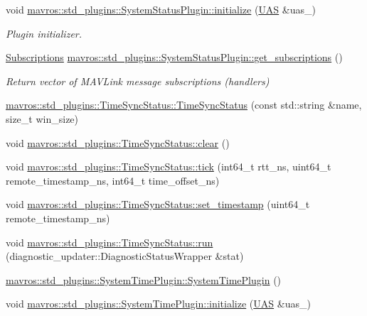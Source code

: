 \begin{DoxyCompactItemize}
\item 
void \mbox{\hyperlink{group__plugin_ga6db82bbd7c82ba5963472e1946431313}{mavros\+::std\+\_\+plugins\+::\+System\+Status\+Plugin\+::initialize}} (\mbox{\hyperlink{classmavros_1_1UAS}{U\+AS}} \&uas\+\_\+)
\begin{DoxyCompactList}\small\item\em Plugin initializer. \end{DoxyCompactList}\item 
\mbox{\hyperlink{group__plugin_ga8967d61fc77040e0c3ea5a4585d62a09}{Subscriptions}} \mbox{\hyperlink{group__plugin_gac4e5bdd397cd4f4d5a68a086879ad42e}{mavros\+::std\+\_\+plugins\+::\+System\+Status\+Plugin\+::get\+\_\+subscriptions}} ()
\begin{DoxyCompactList}\small\item\em Return vector of M\+A\+V\+Link message subscriptions (handlers) \end{DoxyCompactList}\item 
\mbox{\hyperlink{group__plugin_ga94f263b4d2d2ef123678bd7bbbc6b5cf}{mavros\+::std\+\_\+plugins\+::\+Time\+Sync\+Status\+::\+Time\+Sync\+Status}} (const std\+::string \&name, size\+\_\+t win\+\_\+size)
\item 
void \mbox{\hyperlink{group__plugin_ga4a6b530e0d59561986622eda95b86938}{mavros\+::std\+\_\+plugins\+::\+Time\+Sync\+Status\+::clear}} ()
\item 
void \mbox{\hyperlink{group__plugin_gafa1a86312af75fd2ad8338575a104b5f}{mavros\+::std\+\_\+plugins\+::\+Time\+Sync\+Status\+::tick}} (int64\+\_\+t rtt\+\_\+ns, uint64\+\_\+t remote\+\_\+timestamp\+\_\+ns, int64\+\_\+t time\+\_\+offset\+\_\+ns)
\item 
void \mbox{\hyperlink{group__plugin_gafb645e825e6162348a94b8e62d6cc9cd}{mavros\+::std\+\_\+plugins\+::\+Time\+Sync\+Status\+::set\+\_\+timestamp}} (uint64\+\_\+t remote\+\_\+timestamp\+\_\+ns)
\item 
void \mbox{\hyperlink{group__plugin_gac53ce1e6ed02e01c3a2db41478d69452}{mavros\+::std\+\_\+plugins\+::\+Time\+Sync\+Status\+::run}} (diagnostic\+\_\+updater\+::\+Diagnostic\+Status\+Wrapper \&stat)
\item 
\mbox{\hyperlink{group__plugin_ga34c7a6c4d0439bf12c630ffcbeef66c9}{mavros\+::std\+\_\+plugins\+::\+System\+Time\+Plugin\+::\+System\+Time\+Plugin}} ()
\item 
void \mbox{\hyperlink{group__plugin_ga37f8fa27ccd8cf66cb81479cba446150}{mavros\+::std\+\_\+plugins\+::\+System\+Time\+Plugin\+::initialize}} (\mbox{\hyperlink{classmavros_1_1UAS}{U\+AS}} \&uas\+\_\+)

\end{DoxyCompactItemize}
